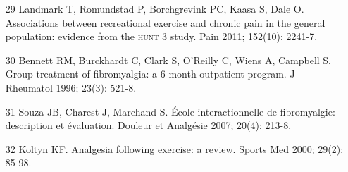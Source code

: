\documentclass{article}
\begin{document}
\begin{itemize}
\item[29] Landmark T, Romundstad P, Borchgrevink PC, Kaasa S, Dale O.
Associations between recreational exercise and chronic pain in the general
population: evidence from the \textsc{hunt} 3 study. Pain 2011; 152(10): 2241-7.

\item[30] Bennett RM, Burckhardt C, Clark S, O'Reilly C, Wiens A, Campbell
S. Group treatment of fibromyalgia: a 6 month outpatient program. J Rheumatol
1996; 23(3): 521-8.

\item[31] Souza JB, Charest J, Marchand S. École interactionnelle de
fibromyalgie: description et évaluation. Douleur et Analgésie 2007; 20(4):
213-8.

\item[32] Koltyn KF. Analgesia following exercise: a review. Sports Med
2000; 29(2): 85-98.

\end{itemize}


\end{document}
